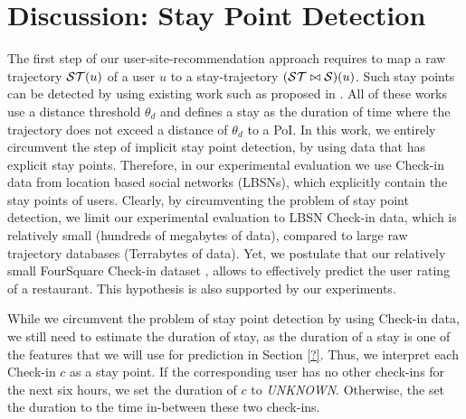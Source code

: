 \section{Discussion: Stay Point Detection} 
The first step of our user-site-recommendation approach requires to map a raw trajectory $\mathcal{ST}(u)$ of a user $u$ to a stay-trajectory $(\mathcal{ST}\bowtie\mathcal{S})(u)$. Such stay points can be detected by using existing work such as proposed in \cite{li2008mining,zheng2009mining,zheng2010geolife,xiao2010finding}. All of these works use a distance threshold $\theta_{d}$ and defines a stay as the duration of time where the trajectory does not exceed a distance of $\theta_{d}$ to a PoI. In this work, we entirely circumvent the step of implicit stay point detection, by using data that has explicit stay points. Therefore, in our experimental evaluation we use Check-in data from location based social networks (LBSNs), which explicitly contain the stay points of users. Clearly, by circumventing the problem of stay point detection, we limit our experimental evaluation to LBSN Check-in data, which is relatively small (hundreds of megabytes of data), compared to large raw trajectory databases (Terrabytes of data).
Yet, we postulate that our relatively small FourSquare Check-in dataset \cite{?}, allows to effectively predict the user rating of a restaurant. This hypothesis is also supported by our experiments.

While we circumvent the problem of stay point detection by using Check-in data, we still need to estimate the duration of stay, as the duration of a stay is one of the features that we will use for prediction in Section \ref{?}. Thus, we interpret each Check-in $c$ as a stay point. If the corresponding user has no other check-ins for the next six hours, we set the duration of $c$ to \emph{UNKNOWN}. Otherwise, the set the duration to the time in-between these two check-ins.   